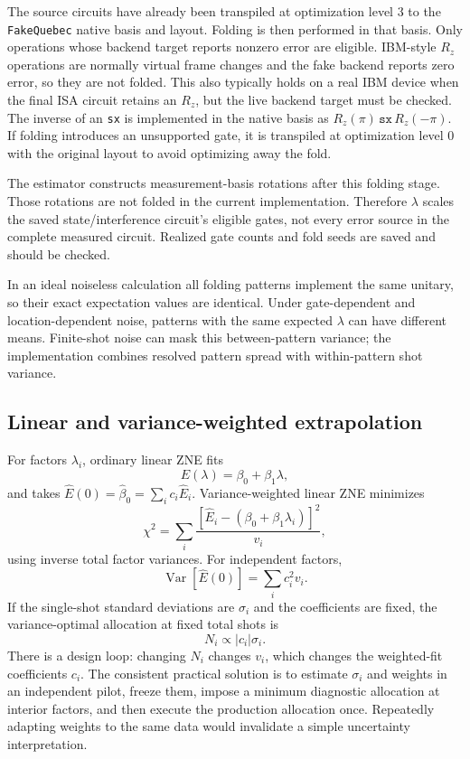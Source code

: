 \documentclass[11pt]{article}
\newcommand{\code}[1]{\texttt{#1}}
\begin{document}
The source circuits have already been transpiled at optimization level 3 to
the \code{FakeQuebec} native basis and layout.  Folding is then performed in
that basis.  Only operations whose backend target reports nonzero error are
eligible.  IBM-style $R_z$ operations are normally virtual frame changes and
the fake backend reports zero error, so they are not folded.  This also
typically holds on a real IBM device when the final ISA circuit retains an
$R_z$, but the live backend target must be checked.  The inverse of an
\code{sx} is implemented in the native basis as
$R_z(\pi)\,\code{sx}\,R_z(-\pi)$.  If folding introduces an unsupported gate,
it is transpiled at optimization level 0 with the original layout to avoid
optimizing away the fold.

The estimator constructs measurement-basis rotations after this folding
stage.  Those rotations are not folded in the current implementation.
Therefore $\lambda$ scales the saved state/interference circuit's eligible
gates, not every error source in the complete measured circuit.  Realized
gate counts and fold seeds are saved and should be checked.

In an ideal noiseless calculation all folding patterns implement the same
unitary, so their exact expectation values are identical.  Under
gate-dependent and location-dependent noise, patterns with the same expected
$\lambda$ can have different means.  Finite-shot noise can mask this
between-pattern variance; the implementation combines resolved pattern spread
with within-pattern shot variance.

\subsection{Linear and variance-weighted extrapolation}

For factors $\lambda_i$, ordinary linear ZNE fits
\[
  E(\lambda)=\beta_0+\beta_1\lambda,
\]
and takes $\widehat E(0)=\widehat\beta_0=\sum_i c_i\widehat E_i$.
Variance-weighted linear ZNE minimizes
\[
  \chi^2=\sum_i
  \frac{[\widehat E_i-(\beta_0+\beta_1\lambda_i)]^2}{v_i},
\]
using inverse total factor variances.  For independent factors,
\[
 \operatorname{Var}[\widehat E(0)]=\sum_i c_i^2v_i.
\]
If the single-shot standard deviations are $\sigma_i$ and the coefficients
are fixed, the variance-optimal allocation at fixed total shots is
\[
  N_i\propto |c_i|\sigma_i.
\]
There is a design loop: changing $N_i$ changes $v_i$, which changes the
weighted-fit coefficients $c_i$.  The consistent practical solution is to
estimate $\sigma_i$ and weights in an independent pilot, freeze them, impose a
minimum diagnostic allocation at interior factors, and then execute the
production allocation once.  Repeatedly adapting weights to the same data
would invalidate a simple uncertainty interpretation.
\end{document}
